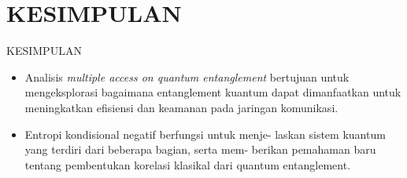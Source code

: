 \section{KESIMPULAN}
\begin{frame}{KESIMPULAN}
    \begin{itemize}\justifying
        \item Analisis \textit{multiple access on quantum entanglement} bertujuan untuk mengeksplorasi bagaimana entanglement kuantum dapat dimanfaatkan untuk meningkatkan efisiensi dan keamanan pada jaringan komunikasi.
        \item  Entropi kondisional negatif berfungsi untuk menje-
laskan sistem kuantum yang terdiri dari beberapa bagian, serta mem-
berikan pemahaman baru tentang pembentukan korelasi klasikal dari
quantum entanglement.
    \end{itemize}
\end{frame}
